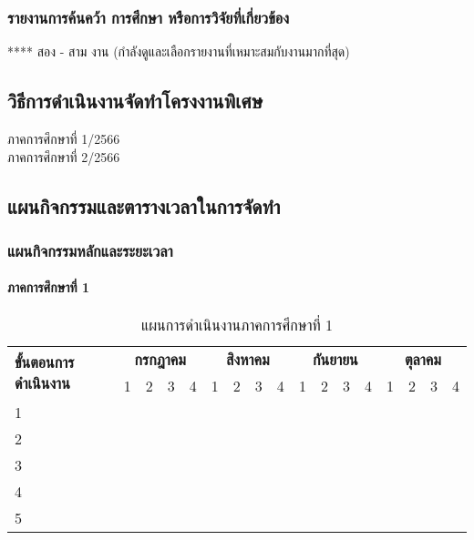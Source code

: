\documentclass[12pt,a4paper]{article}
\begin{document}
\subsubsection{รายงานการค้นคว้า การศึกษา หรือการวิจัยที่เกี่ยวข้อง}
**** สอง - สาม งาน (กำลังดูและเลือกรายงานที่เหมาะสมกับงานมากที่สุด)

\subsection{วิธีการดำเนินงานจัดทำโครงงานพิเศษ}
ภาคการศึกษาที่ 1/2566\\
ภาคการศึกษาที่ 2/2566

\subsection{แผนกิจกรรมและตารางเวลาในการจัดทำ}

\subsubsection{แผนกิจกรรมหลักและระยะเวลา}

\paragraph{ภาคการศึกษาที่ 1}
\begin{table}[h!]
    \centering
    \caption{แผนการดำเนินงานภาคการศึกษาที่ 1}
    \begin{tabular}{|l|c|c|c|c|c|c|c|c|c|c|c|c|c|c|c|c|}
        \hline
        \multirow{2}{*}{\textbf{ขั้นตอนการดำเนินงาน}} & \multicolumn{4}{c|}{\textbf{กรกฎาคม}} & \multicolumn{4}{c|}{\textbf{สิงหาคม}} & \multicolumn{4}{c|}{\textbf{กันยายน}} & \multicolumn{4}{c|}{\textbf{ตุลาคม}} \\
        \cline{2-17}
        & 1 & 2 & 3 & 4 & 1 & 2 & 3 & 4 & 1 & 2 & 3 & 4 & 1 & 2 & 3 & 4 \\
        \hline
        1 & & & & & & & & & & & & & & & & \\
        \hline
        2 & & & & & & & & & & & & & & & & \\
        \hline
        3 & & & & & & & & & & & & & & & & \\
        \hline
        4 & & & & & & & & & & & & & & & & \\
        \hline
        5 & & & & & & & & & & & & & & & & \\
        \hline
    \end{tabular}
    \label{tab:semester1}
\end{table}
\end{document}
